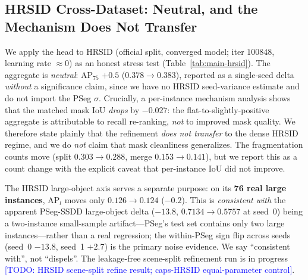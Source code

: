 \documentclass[journal]{IEEEtran}
\newcommand{\TODO}[1]{\textcolor{blue}{[TODO: #1]}}
\begin{document}
\subsection{HRSID Cross-Dataset: Neutral, and the Mechanism Does Not Transfer}
\label{ssec:hrsid}
We apply the head to HRSID (official split, converged model; iter $100848$, learning rate $\approx0$) as an honest stress test (Table~\ref{tab:main-hrsid}). The aggregate is \emph{neutral}: AP$_{75}$ $+0.5$ ($0.378\!\rightarrow\!0.383$), reported as a single-seed delta \emph{without} a significance claim, since we have no HRSID seed-variance estimate and do not import the PSeg $\sigma$. Crucially, a per-instance mechanism analysis shows that the matched mask IoU \emph{drops} by $-0.027$: the flat-to-slightly-positive aggregate is attributable to recall re-ranking, \emph{not} to improved mask quality. We therefore state plainly that the refinement \emph{does not transfer} to the dense HRSID regime, and we do \emph{not} claim that mask cleanliness generalizes. The fragmentation counts move (split $0.303\!\rightarrow\!0.288$, merge $0.153\!\rightarrow\!0.141$), but we report this as a count change with the explicit caveat that per-instance IoU did not improve.

The HRSID large-object axis serves a separate purpose: on its \textbf{76 real large instances}, AP$_{l}$ moves only $0.126\!\rightarrow\!0.124$ ($-0.2$). This is \emph{consistent with} the apparent PSeg-SSDD large-object delta ($-13.8$, $0.7134\!\rightarrow\!0.5757$ at seed~0) being a two-instance small-sample artifact---PSeg's test set contains only two large instances---rather than a real regression; the within-PSeg sign flip across seeds (seed~0 $-13.8$, seed~1 $+2.7$) is the primary noise evidence. We say ``consistent with'', not ``dispels''. The leakage-free scene-split refinement run is in progress \TODO{HRSID scene-split refine result; caps-HRSID equal-parameter control}.
\end{document}
